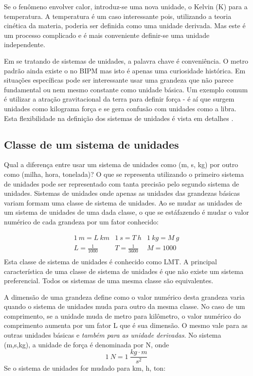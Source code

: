 Se o fenômeno envolver calor, introduz-se uma nova unidade, o Kelvin (K) para a temperatura. A temperatura é um caso interessante pois, utilizando a teoria cinética da materia, poderia ser definida como uma unidade derivada. Mas este é um processo complicado e é mais conveniente definir-se uma unidade independente.

Em se tratando de sistemas de unidades, a palavra chave é conveniência. O metro padrão ainda existe o no BIPM mas isto é apenas uma curiosidade histórica. Em situações específicas pode ser interessante usar uma grandeza que não parece fundamental ou nem mesmo constante como unidade básica. Um exemplo comum é utilizar a atração gravitacional da terra para definir força - é aí que surgem unidades como kilograma força e se gera confusão com unidades como a libra. Esta flexibilidade na definição dos sistemas de unidades é vista em detalhes .

\subsection{Classe de um sistema de unidades}

Qual a diferença entre usar um sistema de unidades como (m, s, kg) por outro como (milha, hora, tonelada)? O que se representa utilizando o primeiro sistema de unidades pode ser representado com tanta precisão pelo segundo sistema de unidades. Sistemas de unidades onde apenas as unidades das grandezas básicas variam formam uma classe de sistema de unidades. Ao se mudar as unidades de um sistema de unidades de uma dada classe, o que se estáfazendo é mudar o valor numérico de cada grandeza por um fator conhecido:

\[
\begin{matrix}
  1\:m = L\:km & 1\:s = T\:h & 1\:kg = M\:g\\
  L=\frac{1}{1000} & T = \frac{1}{3600} & M = 1000\\
\end{matrix}
\]
Esta classe de sistema de unidades é conhecido como LMT. A principal característica de uma classe de sistema de unidades é que não existe um sistema preferencial. Todos os sistemas de uma mesma classe são equivalentes.

A dimensão de uma grandeza define como o valor numérico desta grandeza varia quando o sistema de unidades muda para outro da mesma classe. No caso de um comprimento, se a unidade muda de metro para kilômetro, o valor numérico do comprimento aumenta por um fator L que é sua dimensão. O mesmo vale para as outras unidades básicas e \emph{também para as unidade derivadas}. No sistema (m,s,kg), a unidade de força é denominada por N, onde
\[
1\:N = 1\:\frac{kg\cdot m}{s^2}
\]
Se o sistema de unidades for mudado para km, h, ton: 





